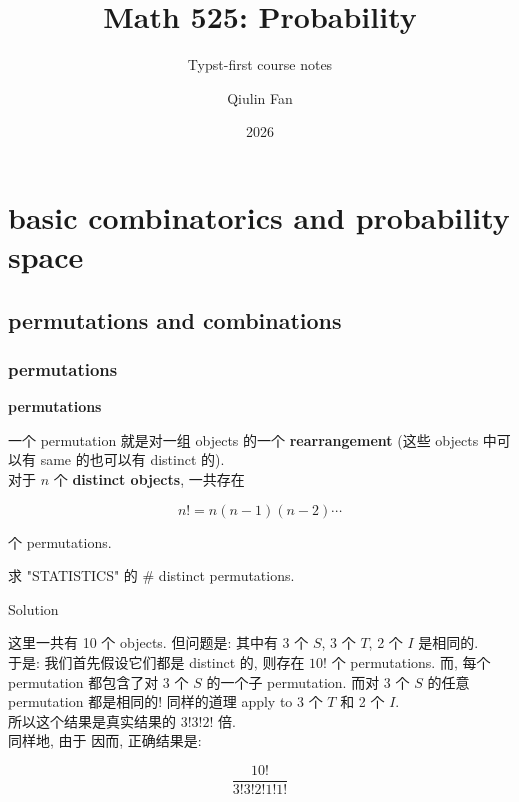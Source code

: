 \documentclass{qlnotes-export}
\title{Math 525: Probability}
\subtitle{Typst-first course notes}
\author{Qiulin Fan}
\date{2026}
\begin{document}
\mainmatter
\chapter{basic combinatorics and probability space}\label{basic-combinatorics-and-probability-space}

\section{permutations and combinations}\label{permutations-and-combinations}

\subsection{permutations}\label{permutations}

\begin{definition}{\protect{}\label{kn-permutations}{\textbf{permutations}}}

一个 permutation 就是对一组 objects 的一个 \textbf{rearrangement} (这些 objects 中可以有 same 的也可以有 distinct 的).\\
对于 \(n\) 个 \textbf{distinct objects}, 一共存在

\[n! = n(n - 1)(n - 2)\cdots\]

个 permutations.

\end{definition}

\begin{example}

求 "STATISTICS" 的 \# distinct permutations.

\end{example}

\begin{qlsolution}{Solution}

这里一共有 10 个 objects. 但问题是: 其中有 3 个 \(S\), 3 个 \(T\), 2 个 \(I\) 是相同的.\\
于是: 我们首先假设它们都是 distinct 的, 则存在 \(10!\) 个 permutations. 而, 每个 permutation 都包含了对 3 个 \(S\) 的一个子 permutation. 而对 3 个 \(S\) 的任意 permutation 都是相同的! 同样的道理 apply to 3 个 \(T\) 和 2 个 \(I\).\\
所以这个结果是真实结果的 \(3!3!2!\) 倍.\\
同样地, 由于 因而, 正确结果是:

\[\frac{10!}{3!3!2!1!1!}\]

\end{qlsolution}
\end{document}
